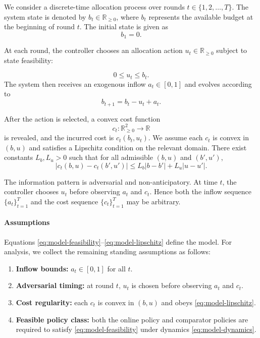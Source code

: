 \documentclass[11pt]{article}
\begin{document}
We consider a discrete-time allocation process over rounds $t\in\{1,2,\ldots,T\}$. The system state is denoted by $b_t\in\mathbb{R}_{\ge 0}$, where $b_t$ represents the available budget at the beginning of round $t$. The initial state is given as
\[
b_1 = 0.
\]

At each round, the controller chooses an allocation action $u_t\in\mathbb{R}_{\ge 0}$ subject to state feasibility:

\begin{equation}
\label{eq:model-feasibility}
0 \le u_t \le b_t.
\end{equation}
The system then receives an exogenous inflow $a_t\in[0,1]$ and evolves according to
\begin{equation}
\label{eq:model-dynamics}
b_{t+1} = b_t - u_t + a_t.
\end{equation}

After the action is selected, a convex cost function
\[
c_t: \mathbb{R}_{\ge 0}^2 \to \mathbb{R}
\]
is revealed, and the incurred cost is $c_t(b_t,u_t)$. We assume each $c_t$ is convex in $(b,u)$ and satisfies a Lipschitz condition on the relevant domain. There exist constants $L_b,L_u>0$ such that for all admissible $(b,u)$ and $(b',u')$,
\begin{equation}
\label{eq:model-lipschitz}
|c_t(b,u)-c_t(b',u')| \le L_b|b-b'| + L_u|u-u'|.
\end{equation}

The information pattern is adversarial and non-anticipatory. At time $t$, the controller chooses $u_t$ before observing $a_t$ and $c_t$. Hence both the inflow sequence $\{a_t\}_{t=1}^T$ and the cost sequence $\{c_t\}_{t=1}^T$ may be arbitrary.

\paragraph{Assumptions}
Equations \eqref{eq:model-feasibility}--\eqref{eq:model-lipschitz} define the model. For analysis, we collect the remaining standing assumptions as follows:
\begin{enumerate}
    \item \textbf{Inflow bounds:} $a_t\in[0,1]$ for all $t$.
    \item \textbf{Adversarial timing:} at round $t$, $u_t$ is chosen before observing $a_t$ and $c_t$.
    \item \textbf{Cost regularity:} each $c_t$ is convex in $(b,u)$ and obeys \eqref{eq:model-lipschitz}.
    \item \textbf{Feasible policy class:} both the online policy and comparator policies are required to satisfy \eqref{eq:model-feasibility} under dynamics \eqref{eq:model-dynamics}.
\end{enumerate}
\end{document}
